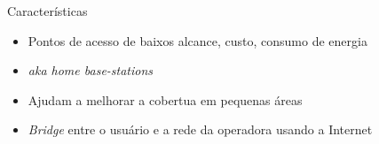 \begin{frame}
  \begin{block}{Características}
    \begin{itemize}
      \item Pontos de acesso de baixos alcance, custo, consumo de energia
      \item \textit{aka \alert{home base-stations}}
      \item Ajudam a melhorar a cobertua em pequenas áreas%
      \item \textit{Bridge} entre o usuário e a rede da operadora usando a
      Internet
    \end{itemize}
  \end{block}
	\begin{figure}[!htb]
		\centering
		\quad %
	\end{figure}
\end{frame}

